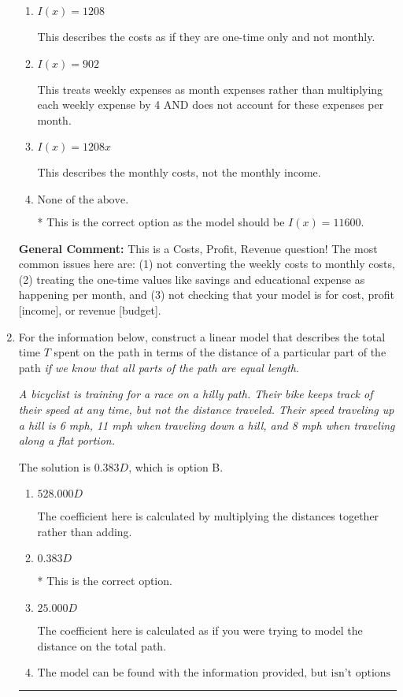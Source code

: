 \documentclass{extbook}[14pt]
\newcommand{\litem}[1]{\item #1

\rule{\textwidth}{0.4pt}}
\begin{document}
\begin{enumerate}
{\begin{enumerate}[label=\Alph*.]
This treats weekly expenses as monthly expenses rather than multiplying each weekly expense by 4.
\item \( I(x) = 1208 \)

This describes the costs as if they are one-time only and not monthly.
\item \( I(x) = 902 \)

This treats weekly expenses as month expenses rather than multiplying each weekly expense by 4 AND does not account for these expenses per month.
\item \( I(x) = 1208 x \)

This describes the monthly costs, not the monthly income.
\item \( \text{None of the above.} \)

* This is the correct option as the model should be $I(x) = 11600$.
\end{enumerate}

\textbf{General Comment:} This is a Costs, Profit, Revenue question! The most common issues here are: (1) not converting the weekly costs to monthly costs, (2) treating the one-time values like savings and educational expense as happening per month, and (3) not checking that your model is for cost, profit [income], or revenue [budget].
}
\litem{
For the information below, construct a linear model that describes the total time $T$ spent on the path in terms of the distance of a particular part of the path \textit{if we know that all parts of the path are equal length}.

\begin{center}
    \textit{ A bicyclist is training for a race on a hilly path. Their bike keeps track of their speed at any time, but not the distance traveled. Their speed traveling up a hill is 6 mph, 11 mph when traveling down a hill, and 8 mph when traveling along a flat portion. }
\end{center}
The solution is \( 0.383 D \), which is option B.\begin{enumerate}[label=\Alph*.]
\item \( 528.000 D \)

The coefficient here is calculated by multiplying the distances together rather than adding.
\item \( 0.383 D \)

* This is the correct option.
\item \( 25.000 D \)

The coefficient here is calculated as if you were trying to model the distance on the total path.
\item \( \text{The model can be found with the information provided, but isn't options 1-3.} \)


\end{enumerate}}
\end{enumerate}
\end{document}
